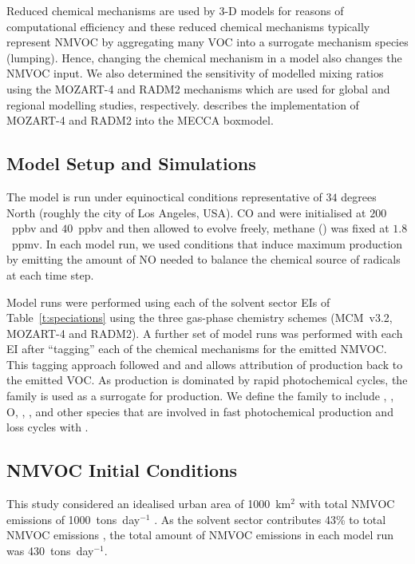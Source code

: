 \documentclass[14pt]{extarticle}
\begin{document}
Reduced chemical mechanisms are used by 3-D models for reasons of computational efficiency and these reduced chemical mechanisms typically represent NMVOC by aggregating many VOC into a surrogate mechanism species (lumping).
Hence, changing the chemical mechanism in a model also changes the NMVOC input.
We also determined the sensitivity of modelled  mixing ratios using the MOZART-4 \citep{Emmons:2010} and RADM2 \citep{Stockwell:1990} mechanisms which are used for global and regional modelling studies, respectively.
\citet{Coates:2015} describes the implementation of MOZART-4 and RADM2 into the MECCA boxmodel.

\subsection{Model Setup and Simulations}
The model is run under equinoctical conditions representative of $34$ degrees North (roughly the city of Los Angeles, USA).
CO and  were initialised at $200$~ppbv and $40$~ppbv and then allowed to evolve freely, methane () was fixed at $1.8$~ppmv.
In each model run, we used  conditions that induce maximum  production by emitting the amount of NO needed to balance the chemical source of radicals at each time step.

Model runs were performed using each of the solvent sector EIs of Table~\ref{t:speciations} using the three gas-phase chemistry schemes (MCM~v3.2, MOZART-4 and RADM2).
A further set of model runs was performed with each EI after ``tagging'' each of the chemical mechanisms for the emitted NMVOC.
This tagging approach followed \citet{Butler:2011} and \citet{Coates:2015} and allows attribution of  production back to the emitted VOC.
As  production is dominated by rapid photochemical cycles, the  family is used as a surrogate for  production.
We define the  family to include , , O, , ,  and other species that are involved in fast photochemical production and loss cycles with .

\subsection{NMVOC Initial Conditions}
This study considered an idealised urban area of 1000~km$^2$ with total NMVOC emissions of 1000~tons~day$^{-1}$ \citep{Warneke:2007}.
As the solvent sector contributes 43\% to total NMVOC emissions \citep{AQEU:2011}, the total amount of NMVOC emissions in each model run was 430~tons~day$^{-1}$.
\end{document}
